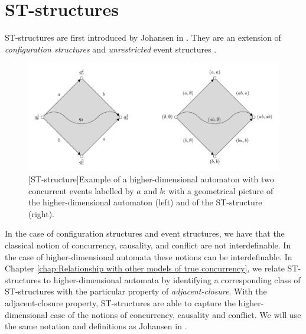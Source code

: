 \section{ST-structures}
\label{sec:ST-structures}
    
    ST-structures are first introduced by Johansen in \cite{Johansen16STstruct}. They are an extension of \emph{configuration structures} \cite{GlabbeekP95config} and \emph{unrestricted} event structures \cite{GlabbeekP09configStruct}. 
    
    
    \begin{figure}[ht]
        \centering
        \includegraphics[scale=0.9]{master_thesis/Figures/3.An-introduction-to-non-interleaving-models-for-concurrency/ST-structure/st-structure-interleaving-square.pdf}
         [ST-structure]{Example of a higher-dimensional automaton with two concurrent events labelled by $a$ and $b$: with a geometrical picture of the higher-dimensional automaton (left) and of the ST-structure (right).}
        \label{fig:st-structure-interleaving-square}
    \end{figure}
    
    In the case of configuration structures and event structures, we have that the classical notion of concurrency, causality, and conflict are not interdefinable. In the case of higher-dimensional automata these notions can be interdefinable. In Chapter \ref{chap:Relationship with other models of true concurrency}, we relate ST-structures to higher-dimensional automata by identifying a corresponding class of ST-structures with the particular property of \emph{adjacent-closure}. With the adjacent-closure property, ST-structures are able to capture the higher-dimensional case of the notions of concurrency, causality and conflict. We will use the same notation and definitions as Johansen in \cite{Johansen16STstruct}.
    
